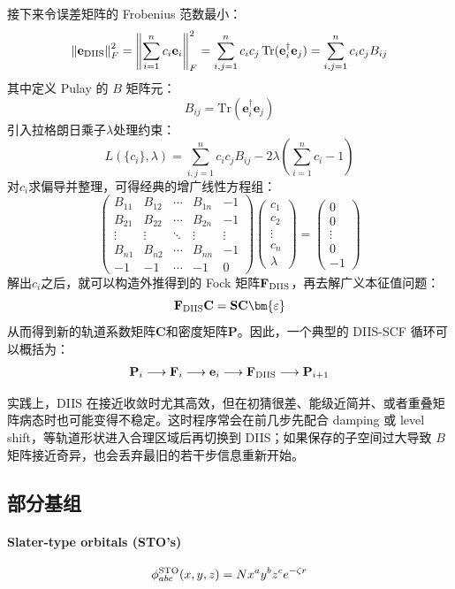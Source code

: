 接下来令误差矩阵的 Frobenius 范数最小：
\[\left\|\mathbf{e}_{\rm DIIS}\right\|_F^2=\left\|\sum_{i=1}^{n}c_i\mathbf{e}_i\right\|_F^2=\sum_{i,j=1}^{n}c_ic_j\,\mathrm{Tr}(\mathbf{e}_i^{\dagger}\mathbf{e}_j)=\sum_{i,j=1}^{n}c_ic_j B_{ij}\]
其中定义 Pulay 的 $B$ 矩阵元：
\[B_{ij}=\mathrm{Tr}(\mathbf{e}_i^{\dagger}\mathbf{e}_j)\]
引入拉格朗日乘子$\lambda$处理约束：
\[L(\{c_i\},\lambda)=\sum_{i,j=1}^{n}c_ic_j B_{ij}-2\lambda\left(\sum_{i=1}^{n}c_i-1\right)\]
对$c_i$求偏导并整理，可得经典的增广线性方程组：
\[
\begin{pmatrix}
B_{11} & B_{12} & \cdots & B_{1n} & -1 \\
B_{21} & B_{22} & \cdots & B_{2n} & -1 \\
\vdots & \vdots & \ddots & \vdots & \vdots \\
B_{n1} & B_{n2} & \cdots & B_{nn} & -1 \\
-1 & -1 & \cdots & -1 & 0
\end{pmatrix}
\begin{pmatrix}
c_1 \\ c_2 \\ \vdots \\ c_n \\ \lambda
\end{pmatrix}
=
\begin{pmatrix}
0 \\ 0 \\ \vdots \\ 0 \\ -1
\end{pmatrix}
\]
解出$c_i$之后，就可以构造外推得到的 Fock 矩阵$\mathbf{F}_{\rm DIIS}$，再去解广义本征值问题：
\[\mathbf{F}_{\rm DIIS}\mathbf{C}=\mathbf{S}\mathbf{C}\bm{\varepsilon}\]
从而得到新的轨道系数矩阵$\mathbf{C}$和密度矩阵$\mathbf{P}$。因此，一个典型的 DIIS-SCF 循环可以概括为：
\[
\mathbf{P}_i \longrightarrow \mathbf{F}_i \longrightarrow \mathbf{e}_i \longrightarrow \mathbf{F}_{\rm DIIS} \longrightarrow \mathbf{P}_{i+1}
\]

实践上，DIIS 在接近收敛时尤其高效，但在初猜很差、能级近简并、或者重叠矩阵病态时也可能变得不稳定。这时程序常会在前几步先配合 damping 或 level shift，等轨道形状进入合理区域后再切换到 DIIS；如果保存的子空间过大导致 $B$ 矩阵接近奇异，也会丢弃最旧的若干步信息重新开始。

\newpage
\subsection{部分基组}
\paragraph*{Slater-type orbitals (STO's)}
\[\phi_{abc}^{\rm{STO}}(x,y,z)=Nx^ay^bz^ce^{-\zeta r}\]

